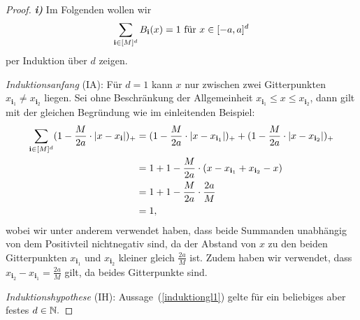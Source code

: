 \begin{proof}
\emph{\textbf{i)}} Im Folgenden wollen wir 
\begin{equation}
\label{induktiongl1}
\sum_{\mathbf{i} \in [M]^d} B_{\mathbf{i}}(x) = 1 \text{ für } x \in [-a , a]^d
\end{equation}
per Induktion über $d$ zeigen. 
	
	 \emph{Induktionsanfang} (IA): Für $d = 1$ kann $x$ nur zwischen zwei Gitterpunkten $x_{\mathbf{i}_1} \neq x_{\mathbf{i}_2}$ liegen. Sei ohne Beschränkung der Allgemeinheit $x_{\mathbf{i}_1}\leq x \leq x_{\mathbf{i}_2}$, dann gilt mit der gleichen Begründung wie im einleitenden Beispiel:
	\begin{equation*}
	\begin{split}
	\sum_{\mathbf{i} \in [M]^d} (1 - \frac{M}{2a} \cdot |x - x_{\mathbf{i}}|)_+ & = (1 - \frac{M}{2a} \cdot |x - x_{\mathbf{i}_1}|)_+ + (1 - \frac{M}{2a} \cdot |x - x_{\mathbf{i}_2}|)_+ \\
	& = 1 + 1 - \frac{M}{2a} \cdot (x - x_{\mathbf{i}_1} + x_{\mathbf{i}_2} - x) \\
	& = 1 + 1 - \frac{M}{2a} \cdot \frac{2a}{M} \\
	& = 1,
	\end{split}
	\end{equation*} wobei wir unter anderem verwendet haben, dass beide Summanden unabhängig von dem Positivteil nichtnegativ sind, da der Abstand von $x$ zu den beiden Gitterpunkten $x_{\mathbf{i}_1}$ und $x_{\mathbf{i}_2}$ kleiner gleich $\frac{2a}{M}$ ist. Zudem haben wir verwendet, dass $x_{\mathbf{i}_2} - x_{\mathbf{i}_1} = \frac{2a}{M}$ gilt, da beides Gitterpunkte sind.     
	
\emph{Induktionshypothese} (IH): Aussage~(\ref{induktiongl1}) gelte für ein beliebiges aber festes $d \in \mathbb{N}.$


\end{proof}
